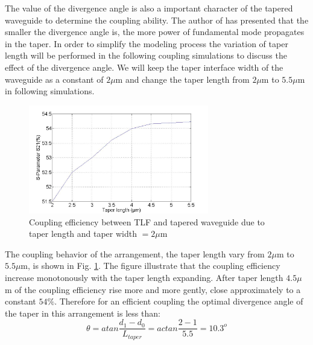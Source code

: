 The value of the divergence angle is also a important character of the tapered waveguide to determine the coupling ability. The author of \cite{study_linear_tapered_waveguides} has presented that the smaller the divergence angle is, the more power of fundamental mode propagates in the taper. In order to simplify the modeling process the variation of taper length will be performed in the following coupling simulations to discuss the effect of the divergence angle.
We will keep the taper interface width of the waveguide as a constant of $2\mu$m and change the taper length from $2\mu$m to $5.5\mu$m in following simulations.\\
  
\begin{figure}[!ht]
\centering
\includegraphics[width=0.7\textwidth]{bilder/tapered_waveguide_dxx}
\caption{Coupling efficiency between TLF and tapered waveguide due to taper length and taper width $= 2\mu$m}
\label{fig:tapered_waveguide_dxx}
\end{figure}
The coupling behavior of the arrangement, the taper length vary from $2\mu$m to $5.5\mu$m, is shown in Fig. \ref{fig:tapered_waveguide_dxx}.  The figure illustrate that the coupling efficiency increase monotonously with the taper length expanding. After taper length $4.5\mu$m of the coupling efficiency rise more and more gently, close approximately to a constant $54\%$. 
Therefore for an efficient coupling the optimal divergence angle of the taper in this arrangement is less than:
\begin{equation}
\theta=atan\frac{d_{1}-d_{0}}{L_{taper}}=actan\frac{2-1}{5.5}=10.3^{o}
\label{eq:divergence_angle}
\end{equation}
